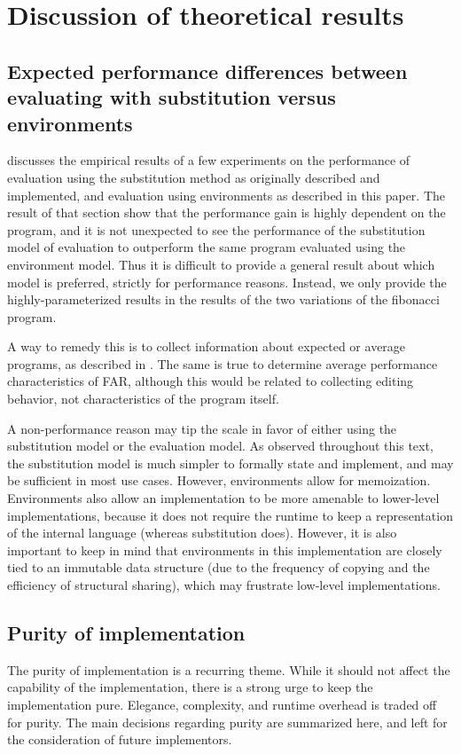 \chapter{Discussion of theoretical results}
\label{sec:discussion}

\section{Expected performance differences between evaluating with substitution versus environments}
\label{sec:expected-perf-diff}

 discusses the empirical results of a few experiments on the performance of evaluation using the substitution method as originally described and implemented, and evaluation using environments as described in this paper. The result of that section show that the performance gain is highly dependent on the program, and it is not unexpected to see the performance of the substitution model of evaluation to outperform the same program evaluated using the environment model. Thus it is difficult to provide a general result about which model is preferred, strictly for performance reasons. Instead, we only provide the highly-parameterized results in the results of the two variations of the fibonacci program.

A way to remedy this is to collect information about expected or average programs, as described in . The same is true to determine average performance characteristics of FAR, although this would be related to collecting editing behavior, not characteristics of the program itself.

A non-performance reason may tip the scale in favor of either using the substitution model or the evaluation model. As observed throughout this text, the substitution model is much simpler to formally state and implement, and may be sufficient in most use cases. However, environments allow for memoization. Environments also allow an implementation to be more amenable to lower-level implementations, because it does not require the runtime to keep a representation of the internal language (whereas substitution does). However, it is also important to keep in mind that environments in this implementation are closely tied to an immutable data structure (due to the frequency of copying and the efficiency of structural sharing), which may frustrate low-level implementations.

\section{Purity of implementation}
\label{sec:env-purity}
The purity of implementation is a recurring theme. While it should not affect the capability of the implementation, there is a strong urge to keep the implementation pure. Elegance, complexity, and runtime overhead is traded off for purity. The main decisions regarding purity are summarized here, and left for the consideration of future implementors.

